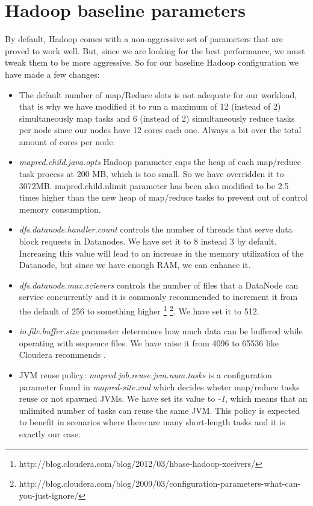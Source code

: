 \section{Hadoop baseline parameters}
By default, Hadoop comes with a non-aggressive set of parameters that are proved to work well. But, since we are looking for the best performance, we must tweak them to be more aggressive. So for our baseline Hadoop configuration we have made a few changes: 
\begin{itemize}
\item The default number of map/Reduce slots is not adequate for our workload, that is why we have modified it to run a maximum of 12 (instead of 2) simultaneously map tasks and 6 (instead of 2) simultaneously reduce tasks per node since our nodes have 12 cores each one. Always a bit over the total amount of cores per node.
\item \textit{mapred.child.java.opts} Hadoop parameter caps the heap of each map/reduce task process at 200 MB, which is too small. So we have overridden it to 3072MB. {mapred.child.ulimit} parameter has been also modified to be 2.5 times higher than the new heap of map/reduce tasks to prevent out of control memory consumption.
\item \textit{dfs.datanode.handler.count} controls the number of threads that serve data block requests in Datanodes. We have set it to 8 instead 3 by default. Increasing this value will lead to an increase in the memory utilization of the Datanode, but since we have enough RAM, we can enhance it.
\item \textit{dfs.datanode.max.xcievers} controls the number of files that a DataNode can service concurrently and it is commonly recommended to increment it from the default of 256 to something higher \footnote{http://blog.cloudera.com/blog/2012/03/hbase-hadoop-xceivers/}  \footnote{\label{1}http://blog.cloudera.com/blog/2009/03/configuration-parameters-what-can-you-just-ignore/}. We have set it to 512.
\item \textit{io.file.buffer.size} parameter determines how much data can be buffered while operating with sequence files. We have raise it from 4096 to 65536 like Cloudera recommends \footnotemark[1].
\item JVM reuse policy: \textit{mapred.job.reuse.jvm.num.tasks} is a configuration parameter found in \textit{mapred-site.xml} which decides wheter map/reduce tasks reuse or not spawned JVMs. We have set its value to \textit{-1}, which means that an unlimited number of tasks can reuse the same JVM. This policy is expected to benefit in scenarios where there are many short-length tasks and it is exactly our case.
\end{itemize}






